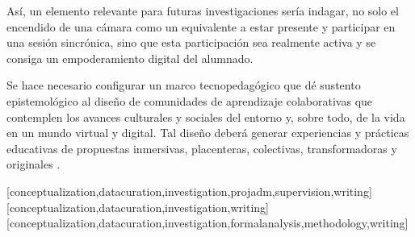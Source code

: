 \documentclass[spanish]{textolivre}
\begin{document}
Así, un elemento relevante para futuras investigaciones sería indagar, no solo el encendido de una cámara como un equivalente a estar presente y participar en una sesión sincrónica, sino que esta participación sea realmente activa y se consiga un empoderamiento digital del alumnado.

Se hace necesario configurar un marco tecnopedagógico que dé sustento epistemológico al diseño de comunidades de aprendizaje colaborativas que contemplen los avances culturales y sociales del entorno y, sobre todo, de la vida en un mundo virtual y digital. Tal diseño deberá generar experiencias y prácticas educativas de propuestas inmersivas, placenteras, colectivas, transformadoras y originales \cite{maggio_practicas_2020}.






\printbibliography\label{sec-bib}


\begin{contributors}
[conceptualization,datacuration,investigation,projadm,supervision,writing]
[conceptualization,datacuration,investigation,writing]
[conceptualization,datacuration,investigation,formalanalysis,methodology,writing]
\end{contributors}
\end{document}
